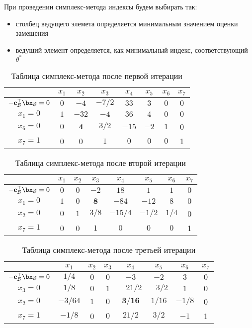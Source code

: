\documentclass[12pt]{article}
\begin{document}
При проведении симплекс-метода индексы будем выбирать так:
\begin{itemize}
\item столбец ведущего элемета определяется минимальным значением оценки замещения
\item ведущий элемент определяется, как минимальный индекс, соответствующий $\theta^*$
\end{itemize}

\newpage

\begin{table}[!ht]
\centering
\caption{Таблица симплекс-метода после первой итерации}
\begin{tabular}{|c|ccccccc|}
\hline
& $x_1$ & $x_2$ & $x_3$ & $x_4$ & $x_5$ & $x_6$ & $x_7$\\
\hline
$-\mathbf{c}_{\mathcal{B}}^{\top}\bx_{\mathcal{B}} = 0$ & $0$ & $-4$ & $-7/2$ & $33$ & $3$ & $0$ & $0$ \\
\hline
$x_1 = 0$ & $1$ & $-32$ & $-4$ & $36$ & $4$ & $0$ & $0$ \\
$x_6 = 0$ & $0$ & $\mathbf{4}$ & $3/2$ & $-15$ & $-2$ & $1$ & 0 \\
$x_7 = 1$ & 0 & 0 & $1$ & $0$ & $0$ & $0$ & 1 \\
\hline
\end{tabular}
\label{tab::simplex_21}
\end{table}

\begin{table}[!ht]
\centering
\caption{Таблица симплекс-метода после второй итерации}
\begin{tabular}{|c|ccccccc|}
\hline
& $x_1$ & $x_2$ & $x_3$ & $x_4$ & $x_5$ & $x_6$ & $x_7$\\
\hline
$-\mathbf{c}_{\mathcal{B}}^{\top}\bx_{\mathcal{B}} = 0$ & $0$ & $0$ & $-2$ & $18$ & $1$ & $1$ & $0$ \\
\hline
$x_1 = 0$ & $1$ & $0$ & $\mathbf{8}$ & $-84$ & $-12$ & $8$ & $0$ \\
$x_2 = 0$ & $0$ & $1$ & $3/8$ & $-15/4$ & $-1/2$ & $1/4$ & 0 \\
$x_7 = 1$ & 0 & 0 & $1$ & $0$ & $0$ & $0$ & 1 \\
\hline
\end{tabular}
\label{tab::simplex_22}
\end{table}

\begin{table}[!ht]
\centering
\caption{Таблица симплекс-метода после третьей итерации}
\begin{tabular}{|c|ccccccc|}
\hline
& $x_1$ & $x_2$ & $x_3$ & $x_4$ & $x_5$ & $x_6$ & $x_7$\\
\hline
$-\mathbf{c}_{\mathcal{B}}^{\top}\bx_{\mathcal{B}} = 0$ & $1/4$ & $0$ & $0$ & $-3$ & $-2$ & $3$ & $0$ \\
\hline
$x_3 = 0$ & $1/8$ & $0$ & $1$ & $-21/2$ & $-3/2$ & $1$ & $0$ \\
$x_2 = 0$ & $-3/64$ & $1$ & $0$ & $\mathbf{3/16}$ & $1/16$ & $-1/8$ & 0 \\
$x_7 = 1$ & $-1/8$ & 0 & $0$ & $21/2$ & $3/2$ & $-1$ & 1 \\
\hline
\end{tabular}
\label{tab::simplex_23}
\end{table}
\end{document}
